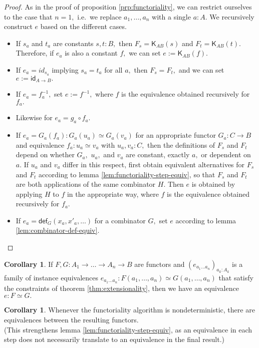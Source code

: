 \documentclass[a4paper]{article}
\theoremstyle{definition}
\newtheorem{corollary}[definition]{Corollary}
\theoremstyle{remark}
\renewcommand{\equiv}{\simeq}
\newcommand{\nm}{\mathsf}
\newcommand{\id}{\nm{id}}
\newcommand{\fndef}[1]{\nm{def}_{#1}}
\newcommand{\combinator}{\nm}
\newcommand{\constFun}{\combinator{K}}
\begin{document}
\begin{proof}
  As in the proof of proposition \ref{prp:functoriality}, we can restrict ourselves to the
  case that $n = 1,$ i.e.\ we replace $a_1,\ldots,a_n$ with a single $a : A.$
  We recursively construct $e$ based on the different cases.
  \begin{itemize}
    \item If $s_a$ and $t_a$ are constants $s,t : B,$ then $F_s = \constFun_{AB}(s)$ and
    $F_t = \constFun_{AB}(t).$ Therefore, if $e_a$ is also a constant $f,$ we can set
    $e := \constFun_{AB}(f).$
    \item If $e_a = id_{s_a}$ implying $s_a = t_a$ for all $a,$ then $F_s = F_t,$ and we
    can set $e := \id_{A{\to}B}.$
    \item If $e_a = f_a^{-1},$ set $e := f^{-1},$ where $f$ is the equivalence obtained
    recursively for $f_a.$
    \item Likewise for $e_a = g_a \circ f_a.$
    \item If $e_a = G_a(f_a) : G_a(u_a) \equiv G_a(v_a)$ for an appropriate functor
    $G_a : C \to B$ and equivalence $f_a : u_a \equiv v_a$ with $u_a,v_a : C,$ then the
    definitions of $F_s$ and $F_t$ depend on whether $G_a,$ $u_a,$ and $v_a$ are constant,
    exactly $a,$ or dependent on $a.$ If $u_a$ and $v_a$ differ in this respect, first
    obtain equivalent alternatives for $F_s$ and $F_t$ according to lemma
    \ref{lem:functoriality-step-equiv}, so that $F_s$ and $F_t$ are both applications of
    the same combinator $H.$ Then $e$ is obtained by applying $H$ to $f$ in the
    appropriate way, where $f$ is the equivalence obtained recursively for $f_a.$
    \item If $e_a = \fndef{G}(x_a,x'_a,\ldots)$ for a combinator $G,$ set $e$ according
    to lemma \ref{lem:combinator-def-equiv}.
    \qedhere
  \end{itemize}
\end{proof}

\begin{corollary}
  \label{cor:extensionality}
  If $F,G : A_1 \to \dots \to A_n \to B$ are functors and
  $(e_{a_1 \ldots a_n})_{a_k : A_k}$ is a family of instance equivalences
  $e_{a_1 \ldots a_n} : F(a_1,\ldots,a_n) \equiv G(a_1,\ldots,a_n)$ that satisfy the
  constraints of theorem \ref{thm:extensionality}, then we have an equivalence
  $e : F \equiv G.$
\end{corollary}

\begin{corollary}
  Whenever the functoriality algorithm is nondeterministic, there are equivalences
  between the resulting functors.\\
  (This strengthens lemma \ref{lem:functoriality-step-equiv}, as an equivalence in
  each step does not necessarily translate to an equivalence in the final result.)
\end{corollary}
\end{document}

